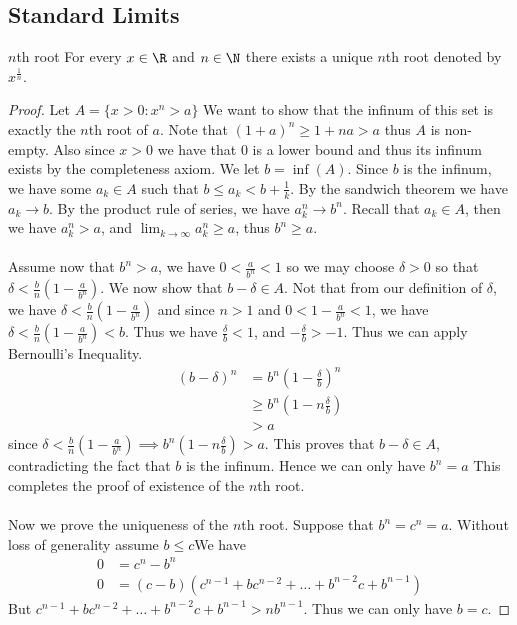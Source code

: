 \subsection{Standard Limits}
\begin{thm}{$n$th root}{} For every $x\in\R$ and $n\in\N$ there exists a unique $n$th root denoted by $x^\frac{1}{n}$. \tcbline
\begin{proof} Let $A=\{x>0:x^n>a\}$ We want to show that the infinum of this set is exactly the $n$th root of $a$. Note that $(1+a)^n\geq1+na>a$ thus $A$ is non-empty. Also since $x>0$ we have that $0$ is a lower bound and thus its infinum exists by the completeness axiom. We let $b=\inf(A)$. Since $b$ is the infinum, we have some $a_k\in A$ such that $b\leq a_k<b+\frac{1}{k}$. By the sandwich theorem we have $a_k\to b$. By the product rule of series, we have $a_k^n\to b^n$. Recall that $a_k\in A$, then we have $a_k^n>a$, and $\lim_{k\to\infty}a_k^n\geq a$, thus $b^n\geq a$. \\~\\
Assume now that $b^n>a$, we have $0<\frac{a}{b^n}<1$ so we may choose $\delta>0$ so that $\delta<\frac{b}{n}(1-\frac{a}{b^n})$. We now show that $b-\delta\in A$. Not that from our definition of $\delta$, we have $\delta<\frac{b}{n}(1-\frac{a}{b^n})$ and since $n>1$ and $0<1-\frac{a}{b^n}<1$, we have $\delta<\frac{b}{n}\left(1-\frac{a}{b^n}\right)<b$. Thus we have $\frac{\delta}{b}<1$, and $-\frac{\delta}{b}>-1$. Thus we can apply Bernoulli's Inequality. 
\begin{align*}
(b-\delta)^n&=b^n\left(1-\frac{\delta}{b}\right)^n \\
&\geq b^n\left(1-n\frac{\delta}{b}\right) \tag{By Bernoulli's Inequality} \\
&>a
\end{align*}
since $\delta<\frac{b}{n}\left(1-\frac{a}{b^n}\right)\implies b^n\left(1-n\frac{\delta}{b}\right)>a$. This proves that $b-\delta\in A$, contradicting the fact that $b$ is the infinum. Hence we can only have $b^n=a$ This completes the proof of existence of the $n$th root.\\~\\
Now we prove the uniqueness of the $n$th root. Suppose that $b^n=c^n=a$. Without loss of generality assume $b\leq c$We have
\begin{align*}
0&=c^n-b^n \\
0&=(c-b)(c^{n-1}+bc^{n-2}+\dots+b^{n-2}c+b^{n-1})
\end{align*}
But $c^{n-1}+bc^{n-2}+\dots+b^{n-2}c+b^{n-1}>nb^{n-1}$. Thus we can only have $b=c$. 
\end{proof}
\end{thm}


